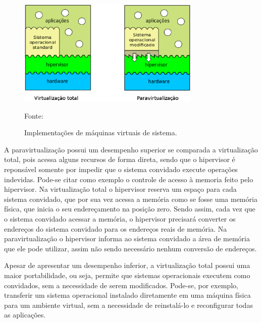 \begin{figure}[vms_implementacao]
 \centering
 \includegraphics[width=330px]{img/vms_implementacao.eps}
 \caption{Implementações de máquinas virtuais de sistema.}
 \label{fig:vms_implementacao}
 Fonte: \citet{maziero2013}
\end{figure}


A paravirtualização possui um desempenho superior se comparada a virtualização total, pois acessa alguns recursos de forma direta, sendo que 
o hipervisor é reponsável somente por impedir que o sistema convidado execute operações indevidas. Pode-se citar como exemplo o controle de
acesso à memoria feito pelo hipervisor. Na virtualização total o hipervisor reserva um espaço para cada sistema convidado, que por sua vez 
acessa a memória como se fosse uma memória física, que inicia o seu endereçamento na posição zero. Sendo assim, cada vez que o sistema convidado 
acessar a memória, o hipervisor precisará converter os endereços do sistema convidado para os endereços reais de memória. Na paravirtualização 
o hipervisor informa ao sistema convidado a área de memória que ele pode utilizar, assim não sendo necessário nenhum conversão de endereços.

Apesar de apresentar um desempenho inferior, a virtualização total possui uma maior portabilidade, ou seja, permite que sistemas operacionais 
executem como convidados, sem a necessidade de serem modificados. Pode-se, por exemplo, transferir um sistema operacional instalado diretamente 
em uma máquina física para um ambiente virtual, sem a necessidade de reinstalá-lo e reconfigurar todas as aplicações.


